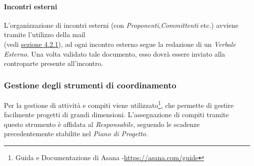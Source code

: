 \paragraph{Incontri esterni}\label{Com esterne} L'organizzazione di incontri esterni (con \textit{Proponenti},\textit{Committenti} etc.) avviene tramite l'utilizzo della mail \\ \mailzeroseven (vedi \hyperref[Com esterne]{sezione 4.2.1}), ad ogni incontro esterno segue la redazione di un \textit{Verbale Esterno}. Una volta validato tale documento, esso dovrà essere inviato alla controparte presente all'incontro.

\subsubsection{Gestione degli strumenti di coordinamento} Per la gestione di attività e compiti viene utilizzato\footnote{Guida e Documentazione di Asana -\url{https://asana.com/guide}}, che permette di gestire facilmente progetti di grandi dimensioni.
L'assegnazione di compiti tramite questo strumento è affidata al \textit{Responsabile}, seguendo le scadenze precedentemente stabilite nel \textit{Piano di Progetto}.